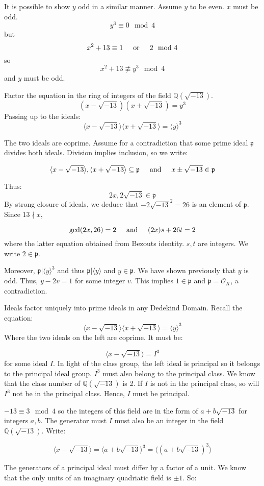 \documentclass{article}
\def\contradiction{{\lightning}}
\newcommand{\textOr}{
    \hspace{5mm}
    \textrm{or}
    \hspace{5mm}
}
\newcommand{\textAnd}{
    \hspace{5mm}
    \textrm{and}
    \hspace{5mm}
}
\newcommand{\<}{{{
    \langle
}}}
\def\>{{{
    \rangle
}}}
\newcommand{\ringInt}{
    {\mathcal{O}}
}
\newcommand{\pideal}{
    {{\mathfrak{p}}}
}
\def\QQ{\mathbb{Q}}
\begin{document}
It is possible to show $y$ odd in a similar manner. Assume $y$ 
to be even. $x$ must be odd. 
\[y^3 \equiv 0 \mod 4\]
 but 
 \[
    x^2 + 13 \equiv 1 \textOr 2 \mod 4
 \]
so
\[
    x^2+13 \not\equiv y^3 \mod 4
\]
and $y$ must be odd. 

Factor the equation in the ring of integers of the field $\QQ(\sqrt{-13})$. 
\[
    (x-\sqrt{-13})(x+\sqrt{-13}) = y^3
\]
Passing up to the ideals:
\[
    \<x-\sqrt{-13}\>\<x+\sqrt{-13}\> = \<y\>^3
\]

The two ideals are coprime. Assume for a contradiction that 
some prime ideal $\pideal$ divides both ideals. Division implies 
inclusion, so we write:

\[
    \<x-\sqrt{-13}\>, \<x+\sqrt{-13}\> \subseteq \pideal
    \textAnd 
    x \pm \sqrt{-13} \in \pideal
\]

Thus:
\[
    2x, 2\sqrt{-13} \in \pideal
\]
By strong closure of ideals, we deduce that 
$-2\sqrt{-13}^2 = 26$ is an element of $\pideal$. Since 
$13 \nmid x$,

\[
    \gcd(2x, 26) = 2 \textAnd 
    (2x)s+26t = 2
\]
where the latter equation obtained from Bezouts identity. 
$s, t$ are integers. We write $2 \in \pideal$. 

Moreover, $\pideal | \<y\>^3$ and thus $\pideal | \<y\>$ 
and $y \in \pideal$. We have shown previously that $y$ is 
odd. Thus, $y - 2v = 1$ for some integer $v$. This implies 
$1 \in \pideal$ and $\pideal = \ringInt_K$, a contradiction. 
\contradiction

Ideals factor uniquely into prime ideals in any Dedekind Domain. 
Recall the equation:
\[
    \<x-\sqrt{-13}\>\<x+\sqrt{-13}\> = \<y\>^3
\]
Where the two ideals on the left are coprime. It must be:

\[
    \<x-\sqrt{-13}\> = I^3
\]
for some ideal $I$. In light of the class group, the left ideal 
is principal so it belongs to the principal ideal group. $I^3$ must 
also belong to the principal class. We know that the class number of 
$\QQ(\sqrt{-13})$ is 2. If $I$ is not in the principal class, so will 
$I^3$ not be in the principal class. Hence, $I$ must be principal. 

$-13 \equiv 3 \mod 4$ so the integers of this field are in the form 
of $a+b\sqrt{-13}$ for integers $a,b$. The generator must $I$ must 
also be an integer in the field $\QQ(\sqrt{-13})$. Write:

\[
    \<x-\sqrt{-13}\> = \<a+b\sqrt{-13}\>^3 
    = \<(a+b\sqrt{-13})^3\>
\]

The generators of a principal ideal must differ by a factor 
of a unit. We know that the only units of an imaginary quadriatic 
field is $\pm1$. So:
\end{document}
